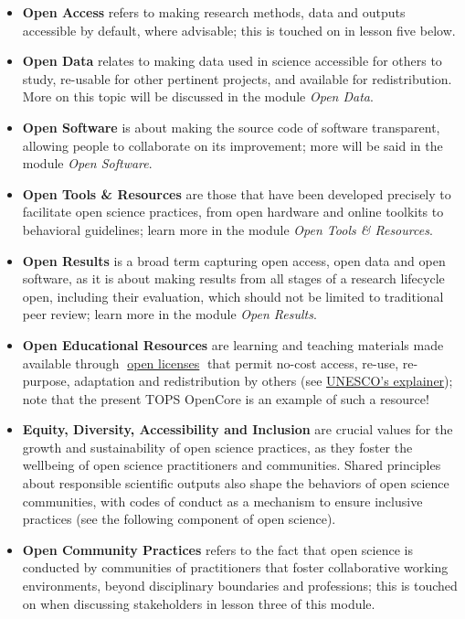 \documentclass[
  letterpaper,
  DIV=11,
  numbers=noendperiod]{scrreport}
\providecommand{\tightlist}{%
  \setlength{\itemsep}{0pt}\setlength{\parskip}{0pt}}\usepackage{longtable,booktabs,array}
\begin{document}
\begin{itemize}
\tightlist
\item
  \textbf{Open Access} refers to making research methods, data and
  outputs accessible by default, where advisable; this is touched on in
  lesson five below.
\item
  \textbf{Open Data} relates to making data used in science accessible
  for others to study, re-usable for other pertinent projects, and
  available for redistribution. More on this topic will be discussed in
  the module \emph{Open Data}.
\item
  \textbf{Open Software} is about making the source code of software
  transparent, allowing people to collaborate on its improvement; more
  will be said in the module \emph{Open Software}.
\item
  \textbf{Open Tools \& Resources} are those that have been developed
  precisely to facilitate open science practices, from open hardware and
  online toolkits to behavioral guidelines; learn more in the module
  \emph{Open Tools \& Resources}.
\item
  \textbf{Open Results} is a broad term capturing open access, open data
  and open software, as it is about making results from all stages of a
  research lifecycle open, including their evaluation, which should not
  be limited to traditional peer review; learn more in the module
  \emph{Open Results}.
\item
  \textbf{Open Educational Resources} are learning and teaching
  materials made available through
  📖\href{https://forrt.org/glossary/open-licenses/}{open licenses}📖
  that permit no-cost access, re-use, re-purpose, adaptation and
  redistribution by others (see
  \href{https://www.unesco.org/en/communication-information/open-solutions/open-educational-resources}{UNESCO's
  explainer}); note that the present TOPS OpenCore is an example of such
  a resource!
\item
  \textbf{Equity, Diversity, Accessibility and Inclusion} are crucial
  values for the growth and sustainability of open science practices, as
  they foster the wellbeing of open science practitioners and
  communities. Shared principles about responsible scientific outputs
  also shape the behaviors of open science communities, with codes of
  conduct as a mechanism to ensure inclusive practices (see the
  following component of open science).
\item
  \textbf{Open Community Practices} refers to the fact that open science
  is conducted by communities of practitioners that foster collaborative
  working environments, beyond disciplinary boundaries and professions;
  this is touched on when discussing stakeholders in lesson three of
  this module.
\end{itemize}
\end{document}
